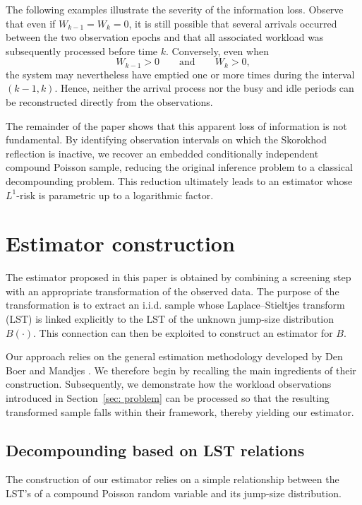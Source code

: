 \documentclass[12pt]{article}
\newcommand{\1}{\mathbf{1}}
\begin{document}
The following examples illustrate the severity of the information loss. Observe that even if $W_{k-1}=W_k=0$,
it is still possible that several arrivals occurred between the two observation epochs and that all associated workload was subsequently processed before time $k$. Conversely, even when
\[
W_{k-1}>0
\qquad\text{and}\qquad
W_k>0,
\]
the system may nevertheless have emptied one or more times during the interval $(k-1,k)$. Hence, neither the arrival process nor the busy and idle periods can be reconstructed directly from the observations.

The remainder of the paper shows that this apparent loss of information
is not fundamental. By identifying observation intervals on which the Skorokhod reflection is
inactive, we recover an embedded conditionally independent compound
Poisson sample, reducing the original inference problem to a classical
decompounding problem. This reduction ultimately leads to an estimator whose $L^1$-risk is
parametric up to a logarithmic factor.

\section{Estimator construction}\label{sec: construction}

The estimator proposed in this paper is obtained by combining a screening step with an appropriate transformation of the observed data. The purpose of the transformation is to extract an i.i.d. sample whose Laplace--Stieltjes transform (LST) is linked explicitly to the LST of the unknown jump-size distribution $B(\cdot)$. This connection can then be exploited to construct an estimator for $B$.

Our approach relies on the general estimation methodology developed by Den Boer and Mandjes \cite{Den Boer2017}. We therefore begin by recalling the main ingredients of their construction. Subsequently, we demonstrate how the workload observations introduced in Section~\ref{sec: problem} can be processed so that the resulting transformed sample falls within their framework, thereby yielding our estimator. 

\subsection{Decompounding based on LST relations}\label{sec: Den Boer}

The construction of our estimator relies on a simple relationship between the LST's of a compound Poisson random variable and its jump-size distribution.
\end{document}
